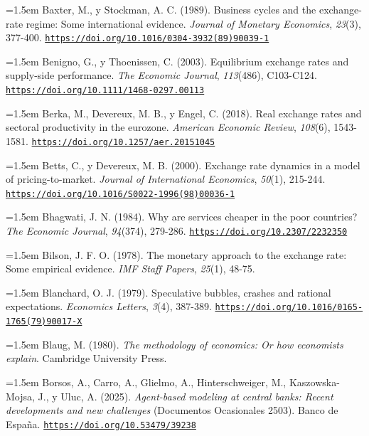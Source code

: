 \documentclass[10pt,a4paper]{article}
\begin{document}
\noindent\hangindent=1.5em Baxter, M., y Stockman, A. C. (1989). Business cycles and the exchange-rate regime: Some international evidence. \textit{Journal of Monetary Economics}, \textit{23}(3), 377-400. \href{https://doi.org/10.1016/0304-3932(89)90039-1}{\nolinkurl{https://doi.org/10.1016/0304-3932(89)90039-1}}

\noindent\hangindent=1.5em Benigno, G., y Thoenissen, C. (2003). Equilibrium exchange rates and supply-side performance. \textit{The Economic Journal}, \textit{113}(486), C103-C124. \href{https://doi.org/10.1111/1468-0297.00113}{\nolinkurl{https://doi.org/10.1111/1468-0297.00113}}

\noindent\hangindent=1.5em Berka, M., Devereux, M. B., y Engel, C. (2018). Real exchange rates and sectoral productivity in the eurozone. \textit{American Economic Review}, \textit{108}(6), 1543-1581. \href{https://doi.org/10.1257/aer.20151045}{\nolinkurl{https://doi.org/10.1257/aer.20151045}}

\noindent\hangindent=1.5em Betts, C., y Devereux, M. B. (2000). Exchange rate dynamics in a model of pricing-to-market. \textit{Journal of International Economics}, \textit{50}(1), 215-244. \href{https://doi.org/10.1016/S0022-1996(98)00036-1}{\nolinkurl{https://doi.org/10.1016/S0022-1996(98)00036-1}}

\noindent\hangindent=1.5em Bhagwati, J. N. (1984). Why are services cheaper in the poor countries? \textit{The Economic Journal}, \textit{94}(374), 279-286. \href{https://doi.org/10.2307/2232350}{\nolinkurl{https://doi.org/10.2307/2232350}}

\noindent\hangindent=1.5em Bilson, J. F. O. (1978). The monetary approach to the exchange rate: Some empirical evidence. \textit{IMF Staff Papers}, \textit{25}(1), 48-75.

\noindent\hangindent=1.5em Blanchard, O. J. (1979). Speculative bubbles, crashes and rational expectations. \textit{Economics Letters}, \textit{3}(4), 387-389. \href{https://doi.org/10.1016/0165-1765(79)90017-X}{\nolinkurl{https://doi.org/10.1016/0165-1765(79)90017-X}}

\noindent\hangindent=1.5em Blaug, M. (1980). \textit{The methodology of economics: Or how economists explain}. Cambridge University Press.

\noindent\hangindent=1.5em Borsos, A., Carro, A., Glielmo, A., Hinterschweiger, M., Kaszowska-Mojsa, J., y Uluc, A. (2025). \textit{Agent-based modeling at central banks: Recent developments and new challenges} (Documentos Ocasionales 2503). Banco de España. \href{https://doi.org/10.53479/39238}{\nolinkurl{https://doi.org/10.53479/39238}}
\end{document}
